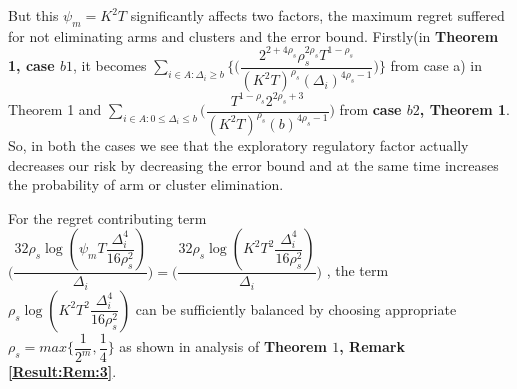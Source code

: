 	But this $\psi_{m}=K^{2}T$ significantly affects two factors, the maximum regret suffered for not eliminating arms and clusters and the error bound. Firstly(in \textbf{Theorem 1, case $b1$}, it becomes $ \sum_{i\in A:\Delta_{i}\geq b}\bigg\lbrace\bigg(\dfrac{2^{2+4\rho_{s}}\rho_{s}^{2\rho_{s}}T^{1-\rho_{s}}}{(K^{2}T)^{\rho_{s}}(\Delta_{i})^{4\rho_{s}-1}}\bigg)\bigg\rbrace$ from case a) in Theorem 1 and $\sum_{i\in A:0\leq \Delta_{i}\leq b} \bigg(\dfrac{T^{1-\rho_{s}}2^{2\rho_{s}+3}}{( K^{2}T)^{\rho_{s}}(b)^{4\rho_{s} -1}} \bigg)$ from \textbf{case $b2$, Theorem 1}. So, in both the cases we see that the exploratory regulatory factor actually decreases our risk by decreasing the error bound and at the same time increases the probability of arm or cluster elimination.
	
	For the regret contributing term $\bigg(\dfrac{32\rho_{s}\log{(\psi_{m}T\dfrac{\Delta_{i}^{4}}{16\rho_{s}^{2}})}}{\Delta_{i}}\bigg) = \bigg(\dfrac{32\rho_{s}\log{(K^{2}T^{2}\dfrac{\Delta_{i}^{4}}{16\rho_{s}^{2}})}}{\Delta_{i}}\bigg)$ , the term $\rho_{s}\log{(K^{2}T^{2}\dfrac{\Delta_{i}^{4}}{16\rho_{s}^{2}})}$ can be sufficiently balanced by choosing appropriate $\rho_{s}=max\bigg\lbrace\dfrac{1}{2^{m}},\dfrac{1}{4}\bigg\rbrace$ as shown in analysis of \textbf{Theorem $1$, Remark \ref{Result:Rem:3}}.

